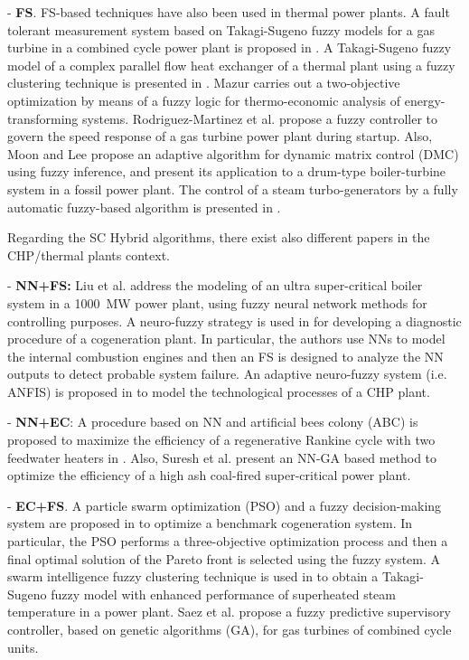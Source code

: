 - \textbf{FS}. FS-based techniques have also been used in thermal power plants. A fault tolerant measurement system based on Takagi-Sugeno fuzzy models for a gas turbine in a combined cycle power plant is proposed in \cite{Berrios-2011}. A Takagi-Sugeno fuzzy model of a complex parallel flow heat exchanger of a thermal plant using a fuzzy clustering technique is presented in \cite{Habi-2011}. Mazur \cite{Mazur-2009} carries out a two-objective optimization by means of a fuzzy logic for thermo-economic analysis of energy-transforming systems. Rodriguez-Martinez et al. \cite{Rodriguez-Martinez-2011} propose a fuzzy controller to govern the speed response of a gas turbine power plant during startup. Also, Moon and Lee \cite{Moon-2011} propose an adaptive algorithm for dynamic matrix control (DMC) using fuzzy inference, and present its application to a drum-type boiler-turbine system in a fossil power plant. The control of a steam turbo-generators by a fully automatic fuzzy-based algorithm is presented in \cite{Gunes-2010}.

Regarding the SC Hybrid algorithms, there exist also different papers in the CHP/thermal plants context. 

- \textbf{NN+FS:} Liu et al. \cite{Liu2010} address the modeling of an ultra super-critical boiler system in a \SI{1000}{MW} power plant, using fuzzy neural network methods for controlling purposes. A neuro-fuzzy strategy is used in \cite{Bare-2005} for developing a diagnostic procedure of a cogeneration plant. In particular, the authors use NNs to model the internal combustion engines and then an FS is designed to analyze the NN outputs to detect probable system failure. An adaptive neuro-fuzzy system (i.e. ANFIS) is proposed in \cite{Mastacan-2005} to model the technological processes of a CHP plant.

- \textbf{NN+EC}: A procedure based on NN and artificial bees colony (ABC) is proposed to maximize the efficiency of a regenerative Rankine cycle with two feedwater heaters in \cite{Rashidi-2011}. Also, Suresh et al. \cite{Suresh-2011} present an NN-GA based method to optimize the efficiency of a high ash coal-fired super-critical power plant.

- \textbf{EC+FS}. A particle swarm optimization (PSO) and a fuzzy decision-making system are proposed in \cite{Sayyaadi-2011} to optimize a benchmark cogeneration system. In particular, the PSO performs a three-objective optimization process and then a final optimal solution of the Pareto front is selected using the fuzzy system. A swarm intelligence fuzzy clustering technique is used in \cite{Su-12} to obtain a Takagi-Sugeno fuzzy model with enhanced performance of  superheated steam temperature in a power plant. Saez et al. \cite{Saez-2007} propose a fuzzy predictive supervisory controller, based on genetic algorithms (GA), for gas turbines of combined cycle units.

